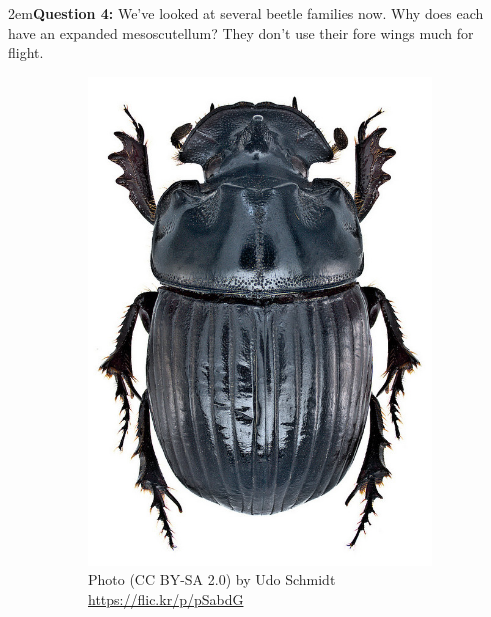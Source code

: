 \documentclass[letterpaper, 11pt]{article}
\begin{document}
\hangindent2em\textbf{Question 4:} We've looked at several beetle families now. Why does each have an expanded mesoscutellum? They don't use their fore wings much for flight. \\

\begin{figure}[ht!]
  \centering
\begin{subfigure}[ht!]{0.25\textwidth}
    \includegraphics[width=\textwidth]{ScarabHabitus1}
  \caption{Photo (CC BY-SA 2.0) by Udo Schmidt \url{https://flic.kr/p/pSabdG}}
  \label{fig:scarabaeid1}
\end{subfigure}
    ~
\begin{subfigure}[ht!]{0.25\textwidth}

\end{subfigure}
\end{figure}
\end{document}
